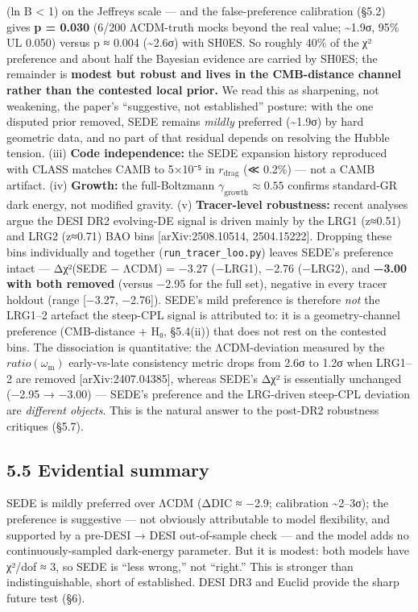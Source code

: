 \documentclass[
  10pt,
]{article}
\begin{document}
(\textbar ln B\textbar{} \textless{} 1) on the Jeffreys scale --- and
the false-preference calibration (§5.2) gives \textbf{p = 0.030} (6/200
ΛCDM-truth mocks beyond the real value; \textasciitilde1.9σ, 95\% UL
0.050) versus p ≈ 0.004 (\textasciitilde2.6σ) with SH0ES. So roughly
40\% of the χ² preference and about half the Bayesian evidence are
carried by SH0ES; the remainder is \textbf{modest but robust and lives
in the CMB-distance channel rather than the contested local prior.} We
read this as sharpening, not weakening, the paper's ``suggestive, not
established'' posture: with the one disputed prior removed, SEDE remains
\emph{mildly} preferred (\textasciitilde1.9σ) by hard geometric data,
and no part of that residual depends on resolving the Hubble tension.
(iii) \textbf{Code independence:} the SEDE expansion history reproduced
with CLASS matches CAMB to 5×10⁻⁵ in \(r_{\mathrm{drag}}\) (≪ 0.2\%) ---
not a CAMB artifact. (iv) \textbf{Growth:} the full-Boltzmann
\(\gamma _{\mathrm{growth}} \approx  0.55\) confirms standard-GR dark
energy, not modified gravity. (v) \textbf{Tracer-level robustness:}
recent analyses argue the DESI DR2 evolving-DE signal is driven mainly
by the LRG1 (z≈0.51) and LRG2 (z≈0.71) BAO bins {[}arXiv:2508.10514,
2504.15222{]}. Dropping these bins individually and together
(\texttt{run\_tracer\_loo.py}) leaves SEDE's preference intact ---
Δχ²(SEDE − ΛCDM) = −3.27 (−LRG1), −2.76 (−LRG2), and \textbf{−3.00 with
both removed} (versus −2.95 for the full set), negative in every tracer
holdout (range {[}−3.27, −2.76{]}). SEDE's mild preference is therefore
\emph{not} the LRG1--2 artefact the steep-CPL signal is attributed to:
it is a geometry-channel preference (CMB-distance + H₀, §5.4(ii)) that
does not rest on the contested bins. The dissociation is quantitative:
the ΛCDM-deviation measured by the \(ratio(\omega _{\mathrm{m}})\)
early-vs-late consistency metric drops from 2.6σ to 1.2σ when LRG1--2
are removed {[}arXiv:2407.04385{]}, whereas SEDE's Δχ² is essentially
unchanged (−2.95 → −3.00) --- SEDE's preference and the LRG-driven
steep-CPL deviation are \emph{different objects}. This is the natural
answer to the post-DR2 robustness critiques (§5.7).

\subsection{5.5 Evidential summary}\label{evidential-summary}

SEDE is mildly preferred over ΛCDM (ΔDIC ≈ −2.9; calibration
\textasciitilde2--3σ); the preference is suggestive --- not obviously
attributable to model flexibility, and supported by a pre-DESI → DESI
out-of-sample check --- and the model adds no continuously-sampled
dark-energy parameter. But it is modest: both models have χ²/dof ≈ 3, so
SEDE is ``less wrong,'' not ``right.'' This is stronger than
indistinguishable, short of established. DESI DR3 and Euclid provide the
sharp future test (§6).
\end{document}
